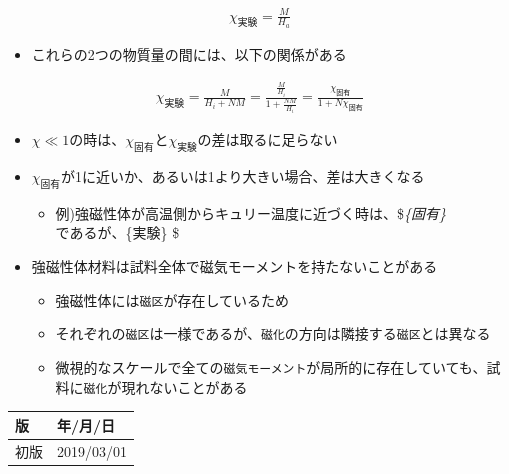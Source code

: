 \documentclass[11pt]{article}
\providecommand{\tightlist}{%
      \setlength{\itemsep}{0pt}\setlength{\parskip}{0pt}}
\begin{document}
\begin{eqnarray}
\chi_{実験} = \frac{M}{H_a}
\end{eqnarray}

\begin{itemize}
\tightlist
\item
  これらの2つの物質量の間には、以下の関係がある
\end{itemize}

\begin{eqnarray}
\chi_{実験} = \frac{M}{H_i + NM} = \frac{\frac{M}{H_i}}{1+\frac{NM}{H_i}} = \frac{\chi_{固有}}{1 + N \chi_{固有}}
\end{eqnarray}

\begin{itemize}
\item
  \(\chi \ll 1\)の時は、\(\chi_{固有}\)と\(\chi_{実験}\)の差は取るに足らない
\item
  \(\chi_{固有}\)が1に近いか、あるいは1より大きい場合、差は大きくなる

  \begin{itemize}
  \tightlist
  \item
    例)強磁性体が高温側からキュリー温度に近づく時は、\$\chi\emph{\{固有\}
    \rightarrow\infty \(であるが、\)\chi}\{実験\}
    \rightarrow {}\$
  \end{itemize}
\end{itemize}

    \begin{itemize}
\item
  強磁性体材料は試料全体で磁気モーメントを持たないことがある

  \begin{itemize}
  \item
    強磁性体には\texttt{磁区}が存在しているため
  \item
    それぞれの\texttt{磁区}は一様であるが、\texttt{磁化}の方向は隣接する\texttt{磁区}とは異なる
  \item
    微視的なスケールで全ての\texttt{磁気モーメント}が局所的に存在していても、試料に\texttt{磁化}が現れないことがある
  \end{itemize}
\end{itemize}

    \begin{longtable}[]{@{}ll@{}}
\toprule
版 & 年/月/日\tabularnewline
\midrule
\endhead
初版 & 2019/03/01\tabularnewline
\bottomrule
\end{longtable}


    
    
    
    
\end{document}
